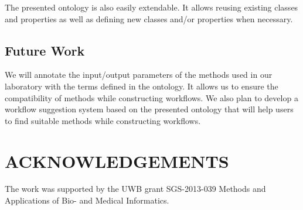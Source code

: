 \documentclass[a4paper,twoside]{article}
\begin{document}
The presented ontology is also easily extendable. It allows reusing existing classes and properties as well as defining new classes and/or properties when necessary.

\subsection{Future Work}
\noindent We will annotate the input/output parameters of the methods used in our laboratory with the terms defined in the ontology. It allows us to ensure the compatibility of methods while constructing workflows. We also plan to develop a workflow suggestion system based on the presented ontology that will help users to find suitable methods while constructing workflows.


\section*{\uppercase{Acknowledgements}}

\noindent The work was supported by the UWB grant SGS-2013-039 Methods and Applications of Bio- and Medical Informatics.

\vfill

{\small
}



\vfill
\end{document}
